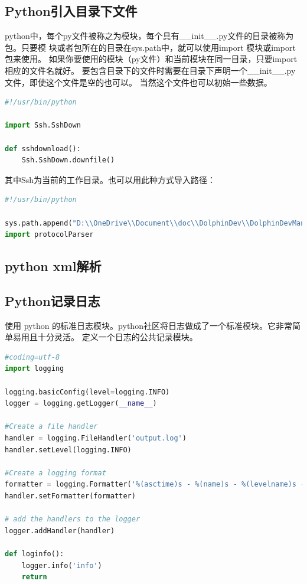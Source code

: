 \documentclass{book}
\begin{document}
\subsection{Python引入目录下文件}

python中，每个py文件被称之为模块，每个具有\_\_init\_\_.py文件的目录被称为包。只要模
块或者包所在的目录在sys.path中，就可以使用import 模块或import 包来使用。
如果你要使用的模块（py文件）和当前模块在同一目录，只要import相应的文件名就好。
要包含目录下的文件时需要在目录下声明一个\_\_init\_\_.py文件，即使这个文件是空的也可以。
当然这个文件也可以初始一些数据。

\begin{lstlisting}[language=Python]
#!/usr/bin/python

import Ssh.SshDown

def sshdownload():
	Ssh.SshDown.downfile()
\end{lstlisting}

其中Ssh为当前的工作目录。也可以用此种方式导入路径：

\begin{lstlisting}[language=Python]
#!/usr/bin/python

sys.path.append("D:\\OneDrive\\Document\\doc\\DolphinDev\\DolphinDevManual\\Scripts\\Python\\Source\\Python\\UI\\Widgets")
import protocolParser
\end{lstlisting}

\subsection{python xml解析}

\subsection{Python记录日志}

使用 python 的标准日志模块。python社区将日志做成了一个标准模块。它非常简单易用且十分灵活。
定义一个日志的公共记录模块。

\begin{lstlisting}[language=Python]
#coding=utf-8
import logging

logging.basicConfig(level=logging.INFO)
logger = logging.getLogger(__name__)

#Create a file handler
handler = logging.FileHandler('output.log')
handler.setLevel(logging.INFO)

#Create a logging format
formatter = logging.Formatter('%(asctime)s - %(name)s - %(levelname)s - %(message)s')
handler.setFormatter(formatter)

# add the handlers to the logger
logger.addHandler(handler)

def loginfo():
    logger.info('info')
    return
\end{lstlisting}
\end{document}
